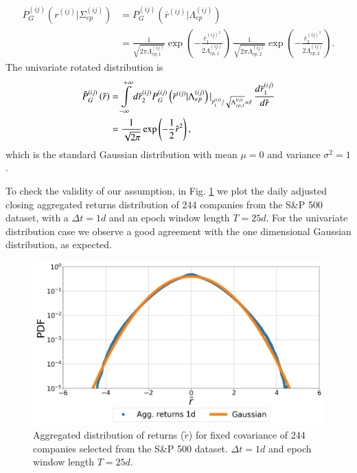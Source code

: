\begin{align}
    P_{G}^{\left(ij\right)}\left(r^{\left(ij\right)}|\Sigma_{ep}^{\left(ij\right)}\right) & =P_{G}^{\left(ij\right)}\left(\bar{r}^{\left(ij\right)}|\Lambda_{ep}^{\left(ij\right)}\right)\\
    & =\frac{1}{\sqrt{2\pi\Lambda_{ep,1}^{\left(ij\right)}}}\exp\left(-\frac{\bar{r}_{1}^{\left(ij\right)^{2}}}{2\Lambda_{ep,1}^{\left(ij\right)}}\right)
    \,\frac{1}{\sqrt{2\pi\Lambda_{ep,2}^{\left(ij\right)}}}\exp\left(-\frac{\bar{r}_{2}^{\left(ij\right)^{2}}}{2\Lambda_{ep,2}^{\left(ij\right)}}\right).
\end{align}
The univariate rotated distribution is
\begin{align}
    \tilde{P}_{G}^{\left(ij\right)}\left(\tilde{r}\right) & =\intop_{-\infty}^{+\infty}d\bar{r}_{2}^{\left(ij\right)}P_{G}^{\left(ij\right)}\left(\bar{r}^{\left(ij\right)}|\Lambda_{ep}^{\left(ij\right)}\right)\vert_{\bar{r}_{1}^{\left(ij\right)}/\sqrt{\Lambda_{ep,1}^{\left(ij\right)}}=\tilde{r}}\,\frac{d\bar{r}_{1}^{\left(ij\right)}}{d\tilde{r}}\\
    & =\frac{1}{\sqrt{2\pi}}\exp\left(-\frac{1}{2}\tilde{r}^{2}\right),
\end{align}
which is the standard Gaussian distribution with mean $\mu = 0$ and variance
$\sigma^2 = 1$.

To check the validity of our assumption, in Fig.
\ref{fig:gaussian_agg_returns_epoch} we plot the daily adjusted closing
aggregated returns distribution of 244 companies from the S\&P 500 dataset,
with a $\Delta t = 1d$ and an epoch window length $T = 25d$. For the
univariate distribution case we observe a good agreement with the one 
dimensional Gaussian distribution, as expected.

\begin{figure}[htbp]
    \centering
    \includegraphics[width=0.6\columnwidth]
    {figures/05_gaussian_agg_returns_short_epoch.png}
    \caption{Aggregated distribution of returns ($\tilde{r}$) for fixed 
             covariance of 244 companies selected from the S\&P 500 
             dataset. $\Delta t = 1d$ and epoch window length $T=25d$.}
    \label{fig:gaussian_agg_returns_epoch}
\end{figure}

